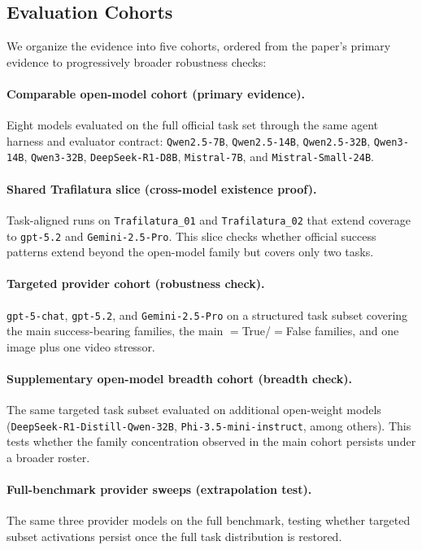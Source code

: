 \subsection{Evaluation Cohorts}

We organize the evidence into five cohorts, ordered from the paper's primary
evidence to progressively broader robustness checks:

\paragraph{Comparable open-model cohort (primary evidence).}
Eight models evaluated on the full official \gittaskbench task set through the
same agent harness and evaluator contract:
\texttt{Qwen2.5-7B},
\texttt{Qwen2.5-14B},
\texttt{Qwen2.5-32B},
\texttt{Qwen3-14B},
\texttt{Qwen3-32B},
\texttt{DeepSeek-R1-D8B},
\texttt{Mistral-7B}, and
\texttt{Mistral-Small-24B}.
%
\paragraph{Shared Trafilatura slice (cross-model existence proof).}
Task-aligned runs on \texttt{Trafilatura\_01} and \texttt{Trafilatura\_02} that
extend coverage to \texttt{gpt-5.2} and \texttt{Gemini-2.5-Pro}. This slice
checks whether official success patterns extend beyond the open-model family
but covers only two tasks.
%
\paragraph{Targeted provider cohort (robustness check).}
\texttt{gpt-5-chat}, \texttt{gpt-5.2}, and \texttt{Gemini-2.5-Pro} on a
structured task subset covering the main success-bearing families, the main
\processmetric$=$True/\resultmetric$=$False families, and one image plus one
video stressor.
%
\paragraph{Supplementary open-model breadth cohort (breadth check).}
The same targeted task subset evaluated on additional open-weight models
(\texttt{DeepSeek-R1-Distill-Qwen-32B}, \texttt{Phi-3.5-mini-instruct}, among
others). This tests whether the family concentration observed in the main
cohort persists under a broader roster.
%
\paragraph{Full-benchmark provider sweeps (extrapolation test).}
The same three provider models on the full benchmark, testing whether targeted
subset activations persist once the full task distribution is restored.

